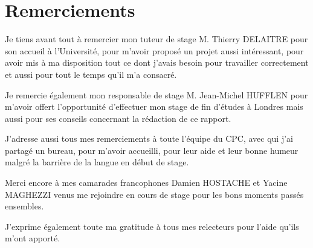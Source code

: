 \chapter*{Remerciements}

Je tiens avant tout \`a remercier mon tuteur de stage M. Thierry DELAITRE pour son accueil \`a l'Universit\'e, pour m'avoir propos\'e un projet aussi int\'eressant, pour avoir mis \`a ma disposition tout ce dont j'avais besoin pour travailler correctement et aussi pour tout le temps qu'il m'a consacr\'e.

Je remercie \'egalement mon responsable de stage M. Jean-Michel HUFFLEN pour m'avoir offert l'opportunit\'e d'effectuer mon stage de fin d'\'etudes \`a Londres mais aussi pour ses conseils concernant la r\'edaction de ce rapport.

J'adresse aussi tous mes remerciements \`a toute l'\'equipe du CPC, avec qui j'ai partag\'e un bureau, pour m'avoir accueilli, pour leur aide et leur bonne humeur malgr\'e la barri\`ere de la langue en d\'ebut de stage.

Merci encore \`a mes camarades francophones Damien HOSTACHE et Yacine MAGHEZZI venus me rejoindre en cours de stage pour les bons moments pass\'es ensembles.

J'exprime \'egalement toute ma gratitude \`a tous mes relecteurs pour l'aide qu'ils m'ont apport\'e.

\clearpage
